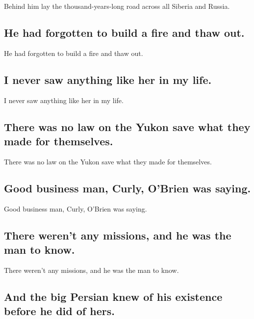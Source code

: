 \documentclass[]{article}
\begin{document}
Behind him lay the thousand-years-long road across all Siberia and
Russia.

\hypertarget{he-had-forgotten-to-build-a-fire-and-thaw-out.}{%
\subsection{He had forgotten to build a fire and thaw
out.}\label{he-had-forgotten-to-build-a-fire-and-thaw-out.}}

He had forgotten to build a fire and thaw out.

\hypertarget{i-never-saw-anything-like-her-in-my-life.}{%
\subsection{I never saw anything like her in my
life.}\label{i-never-saw-anything-like-her-in-my-life.}}

I never saw anything like her in my life.

\hypertarget{there-was-no-law-on-the-yukon-save-what-they-made-for-themselves.}{%
\subsection{There was no law on the Yukon save what they made for
themselves.}\label{there-was-no-law-on-the-yukon-save-what-they-made-for-themselves.}}

There was no law on the Yukon save what they made for themselves.

\hypertarget{good-business-man-curly-obrien-was-saying.}{%
\subsection{Good business man, Curly, O'Brien was
saying.}\label{good-business-man-curly-obrien-was-saying.}}

Good business man, Curly, O'Brien was saying.

\hypertarget{there-werent-any-missions-and-he-was-the-man-to-know.}{%
\subsection{There weren't any missions, and he was the man to
know.}\label{there-werent-any-missions-and-he-was-the-man-to-know.}}

There weren't any missions, and he was the man to know.

\hypertarget{and-the-big-persian-knew-of-his-existence-before-he-did-of-hers.}{%
\subsection{And the big Persian knew of his existence before he did of
hers.}\label{and-the-big-persian-knew-of-his-existence-before-he-did-of-hers.}}
\end{document}
